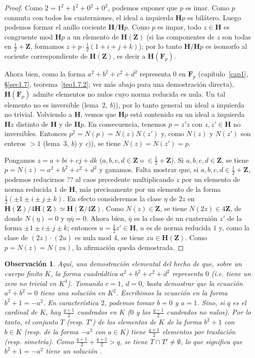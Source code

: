 \documentclass[10pt,oneside,bibtotoc,smallheadings,leqno,a5paper,DIV=12]{scrbook}
\newcommand{\ZZ}{\mathbf{Z}}
\newcommand{\FF}{\mathbf{F}}
\newcommand{\HH}{\mathbf{H}}
\newcommand{\QED}{}%
\newcommand{\oline}[1]{\overline{#1}}
\numberwithin{equation}{section}
\theoremstyle{defi}
\theoremstyle{enonce}
\theoremstyle{rem}
\newtheorem*{remark*}{Observaci\'on}
\numberwithin{theorem}{section}
\numberwithin{proposition}{section}
\numberwithin{definition}{section}
\numberwithin{lemma}{section}
\numberwithin{corollary}{section}
\numberwithin{example}{section}
\numberwithin{footnote}{section}%
\begin{document}
\begin{proof}
Como $2 = 1^{2}+1^{2}+0^{2}+0^{2}$, podemos suponer que $p$ es imar. Como $p$ conmuta con todos los
cuaterniones, el ideal a izquierda $\HH p$ es bil\'atero. Luego podemos formar el anillo cociente
$\HH/\HH p$. Como $p$ es impar, todo $z\in\HH$ es congruente mod $\HH p$ a un elemento de $\HH(\ZZ)$
(si las componentes de $z$ son todas en $\frac{1}{2}+\ZZ$, formamos $z+p\cdot\frac{1}{2}(1+i+j+k)$);
por lo tanto $\HH/\HH p$ es isomorfo al cociente correspondiente de $\HH(\ZZ)$, es decir a $\HH(\FF_{p})$.

Ahora bien, como la forma $a^{2}+b^{2}+c^{2}+d^{2}$ representa $0$ en $\FF_{p}$ (cap\'itulo~\ref{cap1},
\S\ref{sec1.7}, teorema~\ref{teo1.7.2};
ver m\'as abajo para una demostraci\'on directa), $\HH(\FF_{p})$ admite elementos
no nulos cuyo norma reducida es nula. Un tal elemento no es inversible (lema~2, {\itshape b})), por lo
tanto general un ideal a izquierda no trivial. Volviendo a $\HH$, vemos que $\HH p$ est\'a
contenido en un ideal a izquierda $\HH z$ distinto de $\HH$ y de $\HH p$. En consecuencia, tenemos
$p = z'z$ con $z,z'\in\HH$ no inversibles. Entonces $p^{2}=N(p)=N(z)N(z')$ y, como
$N(z)$ y $N(z')$ son enteros $>1$ (lema~3, {\itshape b}) y {\itshape c})), se tiene $N(z) = N(z') = p$.

Pongamos $z = a+bi+cj+dk$ ($a,b,c,d\in\ZZ$ o $\in\frac{1}{2}+\ZZ$). Si $a,b,c,d\in\ZZ$, se tiene
$p = N(z) = a^{2}+b^{2}+c^{2}+d^{2}$ y ganamos. Falta mostrar que, si $a,b,c,d\in\frac{1}{2}+\ZZ$, podemos
reducirnos ?? al caos precedente multiplicando $z$ por un elemento de norma reducida $1$ de $\HH$, m\'as
precisamente por un elemento de la forma $\frac{1}{2}(\pm 1\pm i\pm j\pm k)$. En efecto consideremos
la clase $\eta$ de $2z$ en $\HH(\ZZ)/4\HH(\ZZ)\simeq\HH(\ZZ/4\ZZ)$. Como $N(z)\in\ZZ$, se tiene
$N(2z)\in 4\ZZ$, de donde $N(\eta) = 0$ y $\eta\oline\eta = 0$. Ahora bien, $\oline\eta$ es la clase
de un cuaterni\'on $z'$ de la forma $\pm 1\pm i\pm j\pm k$; entonces $u = \frac{1}{2}z'\in\HH$,
$u$ es de norma reducida $1$ y, como la clase de $(2z)\cdot(2u)$ es nula mod $4$, se tiene $zu\in\HH(\ZZ)$.
Como $p=N(z)=N(zu)$, la afirmaci\'on queda demostrada. \QED
\end{proof}

\begin{remark*}
Aqu\'i, una demostraci\'on elemental del hecho de que, sobre un cuerpo finito $K$, la forma cuadr\'adtica
$a^{2}+b^{2}+c^{2}+d^{2}$ {\em representa} $0$ (i.e. tiene un zero no trivial en $K^{4}$). Tomando
$c=1$, $d=0$, basta demostrar que la ecuaci\'on $a^{2}+b^{2}=0$ tiene una soluci\'on en $K^{2}$. Escribimos
la ecuaci\'on en la forma $b^{2}+1=-a^{2}$. En caracter\'istica $2$, podemos tomar $b=0$ y $a=1$.
Sino, si $q$ es el cardinal de $K$, hay $\frac{q+1}{2}$ cuadrados en $K$
($0$ y los $\frac{q-1}{2}$ cuadrados no nulos). Por lo tanto, el conjunto $T$ (resp. $T'$) de los elementos
de $K$ de la forma $b^{2}+1$ con $b\in K$ (resp. de la forma $-a^{2}$ con $a\in K$) tiene
$\frac{q+1}{2}$ elementos por traslaci\'on (resp. simetr\'ia). Como $\frac{q+1}{2}+\frac{q+1}{2}>q$,
se tiene $T\cap T'\neq\emptyset$, lo que significa que $b^{2}+1=-a^{2}$ tiene un soluci\'on \QED.
\end{remark*}
\end{document}
